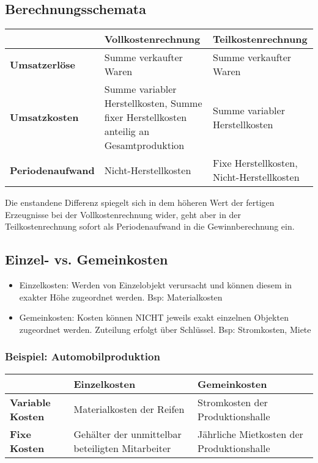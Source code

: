 \subsection{Berechnungsschemata}
\begin{table}[h]
\begin{tabularx}{\textwidth}{|l|X|X|}
	\hline
	& \textbf{Vollkostenrechnung} & \textbf{Teilkostenrechnung} \\
	\hline\hline
	\textbf{Umsatzerlöse} & Summe verkaufter Waren & Summe verkaufter Waren \\
	\hline
	\textbf{Umsatzkosten} & Summe variabler Herstellkosten, Summe fixer Herstellkosten anteilig an Gesamtproduktion & Summe variabler Herstellkosten \\
	\hline
	\textbf{Periodenaufwand} & Nicht-Herstellkosten & Fixe Herstellkosten, Nicht-Herstellkosten \\
	\hline
\end{tabularx}
\end{table}

Die enstandene Differenz spiegelt sich in dem höheren Wert der fertigen Erzeugnisse bei der Vollkostenrechnung wider, geht aber in der Teilkostenrechnung sofort als Periodenaufwand in die Gewinnberechnung ein.

\subsection{Einzel- vs. Gemeinkosten}
\begin{itemize}
	\item Einzelkosten: Werden von Einzelobjekt verursacht und können diesem in exakter Höhe zugeordnet werden. Bsp: Materialkosten
	\item Gemeinkosten: Kosten können NICHT jeweils exakt einzelnen Objekten zugeordnet werden. Zuteilung erfolgt über Schlüssel. Bsp: Stromkosten, Miete
\end{itemize}

\subsubsection{Beispiel: Automobilproduktion}
\begin{table}[h]
\begin{tabularx}{\textwidth}{|l|X|X|}
	\hline
	& \textbf{Einzelkosten} & \textbf{Gemeinkosten} \\
	\hline\hline
	\textbf{Variable Kosten} & Materialkosten der Reifen & Stromkosten der Produktionshalle \\
	\hline
	\textbf{Fixe Kosten} & Gehälter der unmittelbar beteiligten Mitarbeiter & Jährliche Mietkosten der Produktionshalle \\
	\hline
\end{tabularx}
\end{table}


